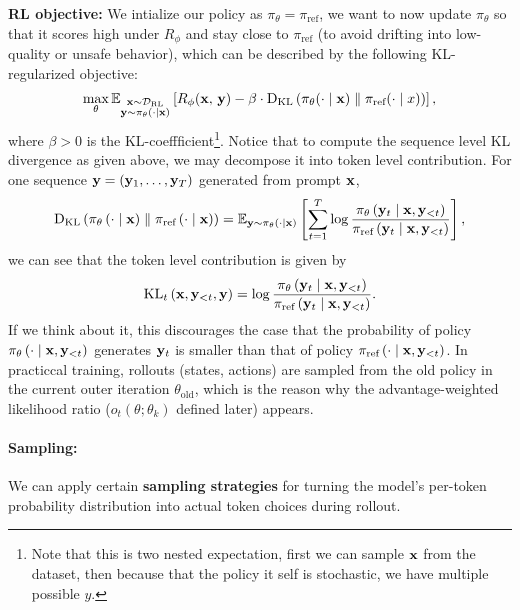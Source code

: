 \documentclass[11pt]{article}  %
\begin{document}
\textbf{RL objective:} We intialize our policy as $\pi_{\theta} = \pi_{\text{ref}}$, we want to now update $\pi_{\theta}$ so that it scores high under $R_{\phi}$ and stay close to $\pi_{\text{ref}}$ (to avoid drifting into low-quality or unsafe behavior), which can be described by the following KL-regularized objective:
\begin{align}
  \label{eq-obj-RL}
  \max_{\theta} \mathbb{E}_{\substack{\mathbf{x} \sim \mathcal{D}_{\text{RL}} \\ \mathbf{y} \sim \pi_{\theta}(\cdot \mid \mathbf{x})}}\left[R_{\phi}(\mathbf{x}, \,\mathbf{y}) - \beta \cdot {\rm D}_{\text{KL}}\left( \pi_{\theta}(\cdot \mid \mathbf{x}) \parallel \pi_{\text{ref}}(\cdot \mid x) \right)\right],
\end{align}
where $\beta > 0$ is the KL-coeffficient\footnote{Note that this is two nested expectation, first we can sample $\mathbf{x}$ from the dataset, then because that the policy it self is stochastic, we have multiple possible $y$.}.
Notice that to compute the sequence level KL divergence as given above, we may decompose it into token level contribution.
For one sequence $\mathbf{y} = \left( \mathbf{y}_1, \hdots, \mathbf{y}_T \right)$ generated from prompt $\mathbf{x}$,
\begin{align*}
  {\rm D}_{\text{KL}}\left( \pi_{\theta}\left( \cdot \mid \mathbf{x} \right) \parallel \pi_{\text{ref}}\left( \cdot \mid \mathbf{x} \right) \right) = \mathbb{E}_{\mathbf{y} \sim \pi_{\theta}\left( \cdot \mid \mathbf{x} \right)}\left[\sum_{t=1}^{T}\log \frac{\pi_{\theta}\left( \mathbf{y}_t \mid \mathbf{x}, \mathbf{y}_{<t} \right)}{\pi_{\text{ref}}\left( \mathbf{y}_t \mid \mathbf{x}, \mathbf{y}_{<t} \right)}\right],
\end{align*}
we can see that the token level contribution is given by 
\begin{align*}
  \text{KL}_t \left( \mathbf{x}, \mathbf{y}_{<t}, \mathbf{y} \right) = \log \frac{\pi_{\theta}\left( \mathbf{y}_t \mid \mathbf{x}, \mathbf{y}_{<t} \right)}{\pi_{\text{ref}}\left( \mathbf{y}_t \mid \mathbf{x}, \mathbf{y}_{<t} \right)}.
\end{align*}
If we think about it, this discourages the case that the probability of policy $\pi_{\theta}\left( \cdot \mid \mathbf{x}, \mathbf{y}_{<t} \right)$ generates $\mathbf{y}_t$ is smaller than that of policy $\pi_{\text{ref}}\left( \cdot \mid \mathbf{x}, \mathbf{y}_{<t} \right)$.
In practiccal training, rollouts (states, actions) are sampled from the old policy in the current outer iteration $\theta_{\text{old}}$, which is the reason why the advantage-weighted likelihood ratio ($o_t(\theta; \theta_k)$ defined later) appears. 

\paragraph{Sampling:} 
We can apply certain \textbf{sampling strategies} for turning the model's per-token probability distribution into actual token choices during rollout.
\end{document}
